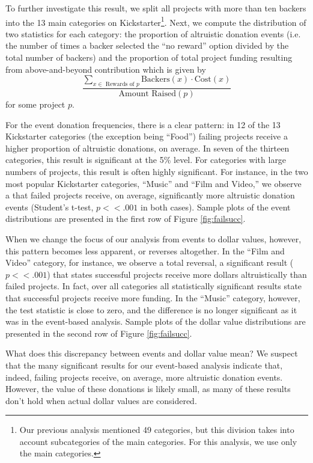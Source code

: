 \documentclass[letterpaper]{article}
\begin{document}
To further investigate this result, we split all projects with more than ten backers into the 13 main categories on Kickstarter\footnote{Our previous analysis mentioned 49 categories, but this division takes into account subcategories of the main categories. For this analysis, we use only the main categories.}. Next, we compute the distribution of two statistics for each category: the proportion of altruistic donation events (i.e. the number of times a backer selected the ``no reward'' option divided by the total number of backers) and the proportion of total project funding resulting from above-and-beyond contribution which is given by
\begin{equation} \label{eq:altruism}
\frac{\sum\limits_{x \in \text{ Rewards of $p$}} \text{Backers}(x) \cdot \text{Cost}(x)}
{\text{Amount Raised}(p)}
\end{equation}
for some project $p$.

For the event donation frequencies, there is a clear pattern: in 12 of the 13 Kickstarter categories (the exception being ``Food'') failing projects receive a higher proportion of altruistic donations, on average. In seven of the thirteen categories, this result is significant at the 5\% level. For categories with large numbers of projects, this result is often highly significant. For instance, in the two most popular Kickstarter categories, ``Music'' and ``Film and Video,'' we observe a that failed projects receive, on average, significantly more altruistic donation events (Student's t-test, $p<<.001$ in both cases). Sample plots of the event distributions are presented in the first row of Figure \ref{fig:failsucc}.

When we change the focus of our analysis from events to dollar values, however, this pattern becomes less apparent, or reverses altogether. In the ``Film and Video'' category, for instance, we observe a total reversal, a significant result ($p << .001$) that states successful projects receive more dollars altruistically than failed projects. In fact, over all categories all statistically significant results state that successful projects receive more funding. In the ``Music'' category, however, the test statistic is close to zero, and the difference is no longer significant as it was in the event-based analysis. Sample plots of the dollar value distributions are presented in the second row of Figure \ref{fig:failsucc}.

What does this discrepancy between events and dollar value mean? We suspect that the many significant results for our event-based analysis indicate that, indeed, failing projects receive, on average, more altruistic donation events. However, the value of these donations is likely small, as many of these results don't hold when actual dollar values are considered.
\end{document}

